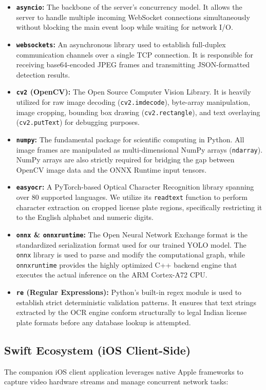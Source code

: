 \begin{itemize}
    \item \textbf{\texttt{asyncio}:} The backbone of the server's concurrency model. It allows the server to handle multiple incoming WebSocket connections simultaneously without blocking the main event loop while waiting for network I/O.
    \item \textbf{\texttt{websockets}:} An asynchronous library used to establish full-duplex communication channels over a single TCP connection. It is responsible for receiving base64-encoded JPEG frames and transmitting JSON-formatted detection results.
    \item \textbf{\texttt{cv2} (OpenCV):} The Open Source Computer Vision Library. It is heavily utilized for raw image decoding (\texttt{cv2.imdecode}), byte-array manipulation, image cropping, bounding box drawing (\texttt{cv2.rectangle}), and text overlaying (\texttt{cv2.putText}) for debugging purposes.
    \item \textbf{\texttt{numpy}:} The fundamental package for scientific computing in Python. All image frames are manipulated as multi-dimensional NumPy arrays (\texttt{ndarray}). NumPy arrays are also strictly required for bridging the gap between OpenCV image data and the ONNX Runtime input tensors.
    \item \textbf{\texttt{easyocr}:} A PyTorch-based Optical Character Recognition library spanning over 80 supported languages. We utilize its \texttt{readtext} function to perform character extraction on cropped license plate regions, specifically restricting it to the English alphabet and numeric digits.
    \item \textbf{\texttt{onnx} \& \texttt{onnxruntime}:} The Open Neural Network Exchange format is the standardized serialization format used for our trained YOLO model. The \texttt{onnx} library is used to parse and modify the computational graph, while \texttt{onnxruntime} provides the highly optimized C++ backend engine that executes the actual inference on the ARM Cortex-A72 CPU.
    \item \textbf{\texttt{re} (Regular Expressions):} Python's built-in regex module is used to establish strict deterministic validation patterns. It ensures that text strings extracted by the OCR engine conform structurally to legal Indian license plate formats before any database lookup is attempted.
\end{itemize}

\subsection{Swift Ecosystem (iOS Client-Side)}
The companion iOS client application leverages native Apple frameworks to capture video hardware streams and manage concurrent network tasks:

